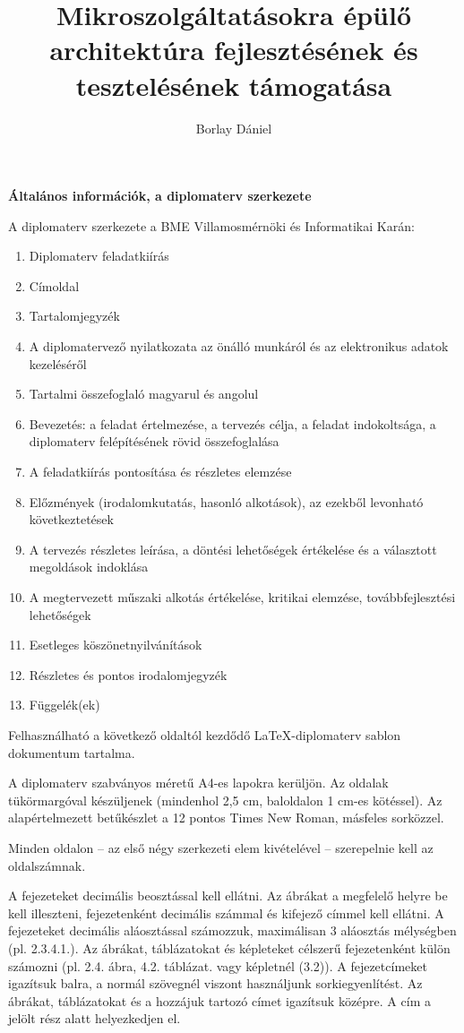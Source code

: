 \documentclass[11pt,magyar,a4paper,oneside,]{report}
\title{Mikroszolgáltatásokra épülő architektúra fejlesztésének és tesztelésének támogatása}
\author{Borlay Dániel}
\begin{document}
\footnotesize

\textbf{Általános információk, a diplomaterv szerkezete}

A diplomaterv szerkezete a BME Villamosmérnöki és Informatikai Karán:

\begin{enumerate}
\def\labelenumi{\arabic{enumi}.}
\itemsep1pt\parskip0pt
\item
  Diplomaterv feladatkiírás
\item
  Címoldal
\item
  Tartalomjegyzék
\item
  A diplomatervező nyilatkozata az önálló munkáról és az elektronikus
  adatok kezeléséről
\item
  Tartalmi összefoglaló magyarul és angolul
\item
  Bevezetés: a feladat értelmezése, a tervezés célja, a feladat
  indokoltsága, a diplomaterv felépítésének rövid összefoglalása
\item
  A feladatkiírás pontosítása és részletes elemzése
\item
  Előzmények (irodalomkutatás, hasonló alkotások), az ezekből levonható
  következtetések
\item
  A tervezés részletes leírása, a döntési lehetőségek értékelése és a
  választott megoldások indoklása
\item
  A megtervezett műszaki alkotás értékelése, kritikai elemzése,
  továbbfejlesztési lehetőségek
\item
  Esetleges köszönetnyilvánítások
\item
  Részletes és pontos irodalomjegyzék
\item
  Függelék(ek)
\end{enumerate}

Felhasználható a következő oldaltól kezdődő \LaTeX-diplomaterv sablon
dokumentum tartalma.

A diplomaterv szabványos méretű A4-es lapokra kerüljön. Az oldalak
tükörmargóval készüljenek (mindenhol 2,5 cm, baloldalon 1 cm-es
kötéssel). Az alapértelmezett betűkészlet a 12 pontos Times New Roman,
másfeles sorközzel.

Minden oldalon -- az első négy szerkezeti elem kivételével --
szerepelnie kell az oldalszámnak.

A fejezeteket decimális beosztással kell ellátni. Az ábrákat a megfelelő
helyre be kell illeszteni, fejezetenként decimális számmal és kifejező
címmel kell ellátni. A fejezeteket decimális aláosztással számozzuk,
maximálisan 3 aláosztás mélységben (pl. 2.3.4.1.). Az ábrákat,
táblázatokat és képleteket célszerű fejezetenként külön számozni (pl.
2.4. ábra, 4.2. táblázat. vagy képletnél (3.2)). A fejezetcímeket
igazítsuk balra, a normál szövegnél viszont használjunk
sorkiegyenlítést. Az ábrákat, táblázatokat és a hozzájuk tartozó címet
igazítsuk középre. A cím a jelölt rész alatt helyezkedjen el.
\end{document}
